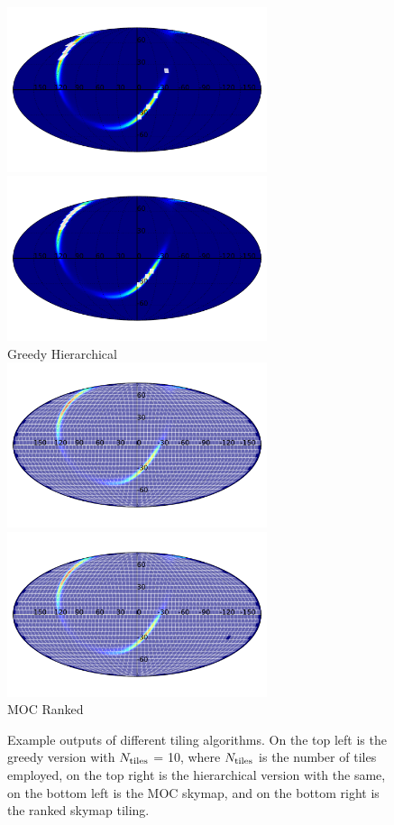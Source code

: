 \documentclass[twocolumn]{aastex62}
\begin{document}
\begin{figure}
    \centering
    \includegraphics[width=3in]{tiling_greedy}
    \includegraphics[width=3in]{tiling_hierarchical} \\
    Greedy \hspace{2.6in}Hierarchical\\
    \includegraphics[width=3in]{tiling_moc}
    \includegraphics[width=3in]{tiling_ranked} \\
    MOC \hspace{2.6in}Ranked
    \caption{Example outputs of different tiling algorithms. On the top left is the greedy version with $N_{\rm tiles}$ = 10, where $N_{\rm tiles}$ is the number of tiles employed, on the top right is the hierarchical version with the same, on the bottom left is the MOC skymap, and on the bottom right is the ranked skymap tiling.}
    \label{fig:tiling}
\end{figure}
\end{document}
